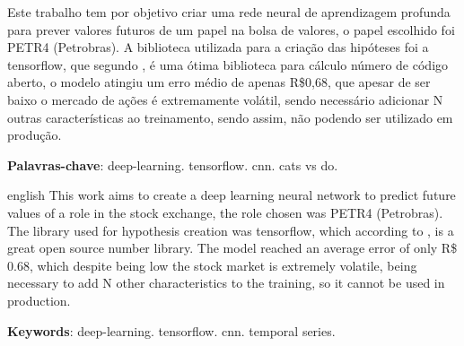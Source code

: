 
\begin{resumoumacoluna}
 Este trabalho tem por objetivo criar uma rede neural de aprendizagem profunda para prever valores futuros de um papel na bolsa de valores, o papel escolhido foi PETR4 (Petrobras). A biblioteca utilizada para a criação das hipóteses foi a tensorflow, que segundo , é uma ótima biblioteca para cálculo número de código aberto, o modelo atingiu um erro médio de apenas R\$0,68, que apesar de ser baixo o mercado de ações é extremamente volátil, sendo necessário adicionar N outras características ao treinamento, sendo assim, não podendo ser utilizado em produção.
 \vspace{\onelineskip}
 
 \noindent
 \textbf{Palavras-chave}: deep-learning. tensorflow. cnn. cats vs do.
\end{resumoumacoluna}


\renewcommand{\resumoname}{Abstract}
\begin{resumoumacoluna}
 \begin{otherlanguage*}{english}
This work aims to create a deep learning neural network to predict future values of a role in the stock exchange, the role chosen was PETR4 (Petrobras). The library used for hypothesis creation was tensorflow, which according to , is a great open source number library. The model reached an average error of only R\$ 0.68, which despite being low the stock market is extremely volatile, being necessary to add N other characteristics to the training, so it cannot be used in production.

   \vspace{\onelineskip}
 
   \noindent
   \textbf{Keywords}: deep-learning. tensorflow. cnn. temporal series.
 \end{otherlanguage*}  
\end{resumoumacoluna}